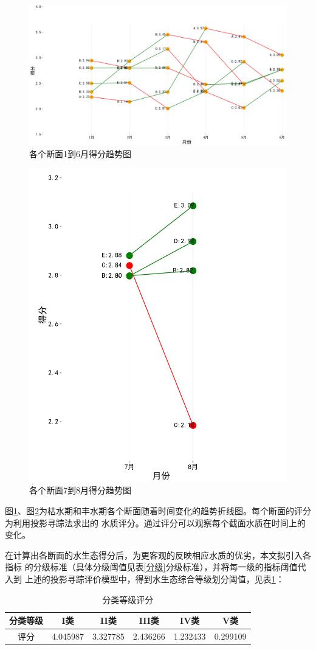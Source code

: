 \documentclass{whutmod}
\begin{document}
\begin{spacing}{1.2}
  \begin{figure}[H]
	\centering
	\includegraphics[width=.9\textwidth]{得分变化1.png}
	\caption{各个断面1到6月得分趋势图}
	\label{变化趋势1}
\end{figure}


\begin{figure}[H]
	\centering
	\includegraphics[width=.5\textwidth]{得分变化2.png}
	\caption{各个断面7到8月得分趋势图}
	\label{变化趋势2}
\end{figure}

图\ref{变化趋势1}、图\ref{变化趋势2}为枯水期和丰水期各个断面随着时间变化的趋势折线图。每个断面的评分为利用投影寻踪法求出的
水质评分。通过评分可以观察每个截面水质在时间上的变化。


  在计算出各断面的水生态得分后，为更客观的反映相应水质的优劣，本文拟引入各指标
  的分级标准（具体分级阈值见表\ref{分级}分级标准），并将每一级的指标阈值代入到
  上述的投影寻踪评价模型中，得到水生态综合等级划分阈值，见表\ref{阈值}：

\begin{table}[H]
	\centering
	\caption{分类等级评分}
	  \begin{tabular}{cccccc} \toprule[1.5pt]
	 分类等级& I类  & II类 & III类 & IV类 & V类 \\ \hline
	  评分&4.045987 & 3.327785 & 2.436266 & 1.232433 & 0.299109 \\ \bottomrule[1.5pt]
	  \end{tabular}%
	\label{阈值}%
  \end{table}%
  

\end{spacing}
\end{document}
